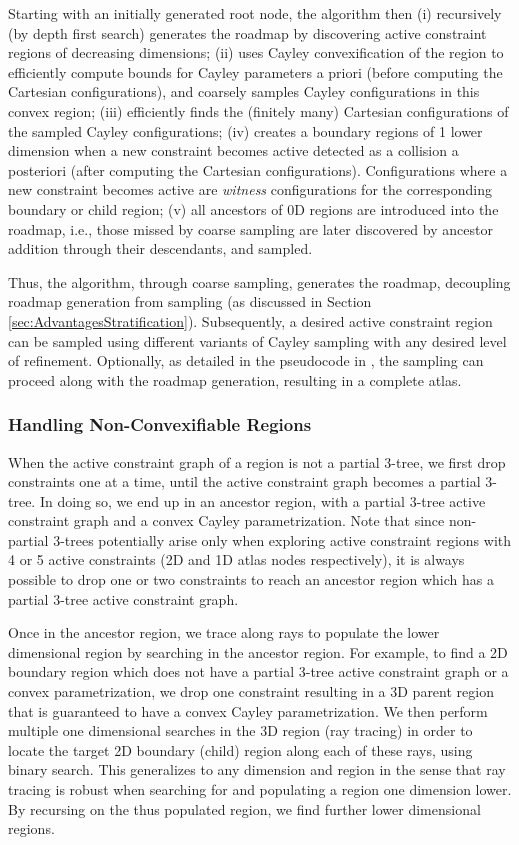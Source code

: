 \documentclass[]{article}
\newcommand{\rahul}[1]{\color{black}{#1}\color{black}}
\begin{document}
Starting with an initially generated root node, the algorithm then (i)
recursively (by depth first search) generates the roadmap by discovering active
constraint regions of decreasing dimensions; (ii) uses Cayley convexification
of the region to efficiently compute bounds for Cayley parameters a priori
(before computing the Cartesian configurations), and coarsely samples Cayley
configurations in this convex region; (iii) efficiently finds the (finitely
many) Cartesian configurations of the sampled Cayley configurations; (iv)
creates a boundary regions of 1 lower dimension when a new constraint becomes
active detected as a collision a posteriori (after computing the Cartesian
configurations). Configurations where a new constraint becomes active are
\emph{witness} configurations for the corresponding boundary or child region;
(v) all ancestors of 0D regions are introduced into the roadmap, i.e., those
missed by coarse sampling are later discovered by ancestor addition through 
their descendants, and sampled.

Thus, the algorithm, through coarse sampling, generates the roadmap, decoupling
roadmap generation from sampling (as discussed in Section
\ref{sec:AdvantagesStratification}).  Subsequently, a desired active
constraint region can be sampled using different variants of Cayley sampling
with any desired level of refinement.  Optionally, as detailed in the
pseudocode in \rahul{Section \ref{sec:app:algorithm} of the Appendix}, 
the sampling can proceed along
with the roadmap generation, resulting in a complete atlas. 

\subsubsection*{Handling Non-Convexifiable Regions}
When the active constraint graph of a region is not a partial 3-tree, 
we first drop
constraints one at a time, until the active constraint graph becomes a partial
3-tree. In doing so, we end up in an ancestor region, with a partial 3-tree
active constraint graph and a convex Cayley parametrization. Note that since
non-partial 3-trees potentially arise only when exploring active
constraint regions with 4 or 5 active constraints (2D and 1D atlas nodes
respectively), it is always possible to drop one or two constraints to reach an
ancestor region which has a partial 3-tree active constraint graph. 

Once in the ancestor region, we trace along rays to populate the lower
dimensional region by searching in the ancestor region. For example, to find a
2D boundary region which does not have a partial 3-tree active constraint graph
or a convex parametrization, we drop one constraint resulting in a 3D parent
region that is guaranteed to have a convex Cayley parametrization. We then
perform multiple one dimensional searches in the 3D region (ray tracing) in
order to locate the target 2D boundary (child) region along each of these rays,
using binary search. This generalizes to any dimension and region in the sense
that ray tracing is robust when searching for and populating a region one
dimension lower. By recursing on the thus populated region, we find further
lower dimensional regions.
\end{document}
